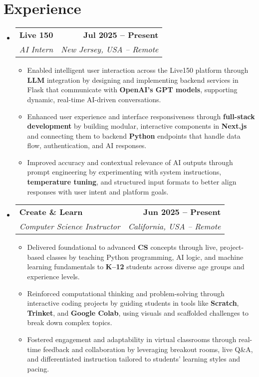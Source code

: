 \documentclass[letterpaper,11pt]{article}
\makeatletter
\newcommand{\resumeItem}[1]{
  \item\small{
    {#1 \vspace{0pt}}
  }
}
\newcommand{\resumeSubheading}[4]{
  \vspace{-2pt}\item
    \begin{tabular*}{1.0\textwidth}[t]{l@{\extracolsep{\fill}}r}
      \textbf{#1} & \textbf{\small #2} \\
      \textit{\small#3} & \textit{\small #4} \\
    \end{tabular*}\vspace{-7pt}
}
\newcommand{\resumeSubHeadingListStart}{\begin{itemize}[leftmargin=0.0in, label={}]}
\newcommand{\resumeSubHeadingListEnd}{\end{itemize}}\vspace{0pt}
\newcommand{\resumeItemListStart}{\begin{itemize}}
\newcommand{\resumeItemListEnd}{\end{itemize}\vspace{-5pt}}
\makeatother
\begin{document}
\section{Experience}
    \resumeSubHeadingListStart
                \resumeSubheading{Live 150}{Jul 2025 -- Present}{AI Intern}{New Jersey, USA -- Remote} 
                \resumeItemListStart
                    \resumeItem{Enabled intelligent user interaction across the Live150 platform through \textbf{LLM} integration by designing and implementing backend services in Flask that communicate with \textbf{OpenAI’s GPT models}, supporting dynamic, real-time AI-driven conversations.}
                    \resumeItem{Enhanced user experience and interface responsiveness through \textbf{full-stack development} by building modular, interactive components in \textbf{Next.js} and connecting them to backend \textbf{Python} endpoints that handle data flow, authentication, and AI responses.}
                    \resumeItem{Improved accuracy and contextual relevance of AI outputs through prompt engineering by experimenting with system instructions, \textbf{temperature tuning}, and structured input formats to better align responses with user intent and platform goals.}
                    \resumeItemListEnd
                \resumeSubheading{Create \& Learn}{Jun 2025 -- Present}{Computer Science Instructor}{California, USA -- Remote} 
                \resumeItemListStart
                    \resumeItem{Delivered foundational to advanced \textbf{CS} concepts through live, project-based classes by teaching Python programming, AI logic, and machine learning fundamentals to \textbf{K–12} students across diverse age groups and experience levels.}
                    \resumeItem{Reinforced computational thinking and problem-solving through interactive coding projects by guiding students in tools like \textbf{Scratch}, \textbf{Trinket}, and \textbf{Google Colab}, using visuals and scaffolded challenges to break down complex topics.}
                    \resumeItem{Fostered engagement and adaptability in virtual classrooms through real-time feedback and collaboration by leveraging breakout rooms, live Q\&A, and differentiated instruction tailored to students' learning styles and pacing.}
                    \resumeItemListEnd
    \resumeSubHeadingListEnd
    \vspace{-12pt}

\end{document}
